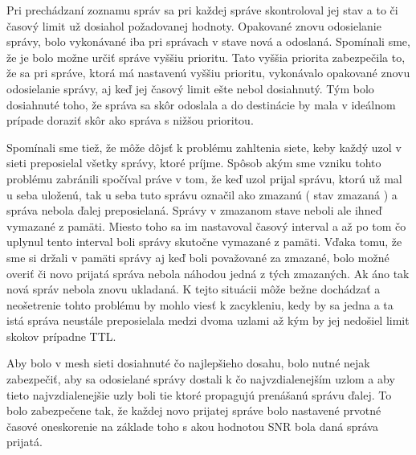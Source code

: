 \documentclass[slovak,master]{diploma}
\begin{document}
Pri prechádzaní zoznamu správ sa pri každej správe skontroloval jej stav a to či časový limit už dosiahol požadovanej hodnoty. Opakované znovu odosielanie 
správy, bolo vykonávané iba pri správach v stave nová a odoslaná. Spomínali sme, že je bolo možne určiť správe vyššiu prioritu. Tato vyššia priorita zabezpečila to, že sa pri správe, 
ktorá má nastavenú vyššiu prioritu, vykonávalo opakované znovu odosielanie správy, aj keď jej časový limit ešte nebol dosiahnutý. Tým bolo dosiahnuté toho, že správa sa 
skôr odoslala a do destinácie by mala v ideálnom prípade doraziť skôr ako správa s nižšou prioritou.

Spomínali sme tiež, že môže dôjsť k problému zahltenia siete, keby každý uzol v sieti preposielal všetky správy, ktoré príjme. Spôsob akým sme vzniku tohto problému zabránili 
spočíval práve v tom, že keď uzol prijal správu, ktorú už mal u seba uloženú, tak u seba tuto správu označil ako zmazanú ( stav zmazaná ) a správa nebola ďalej preposielaná. 
Správy v zmazanom stave neboli ale ihneď vymazané z pamäti. Miesto toho sa im nastavoval časový interval a až po tom čo uplynul tento interval boli správy skutočne vymazané z pamäti. 
Vďaka tomu, že sme si držali v pamäti správy aj keď boli považované za zmazané, bolo možné overiť či novo prijatá správa nebola náhodou jedná z tých zmazaných. Ak áno tak nová 
správ nebola znovu ukladaná. K tejto situácii môže bežne dochádzať a neošetrenie tohto problému by mohlo viesť k zacykleniu, kedy by sa jedna a ta istá správa neustále 
preposielala medzi dvoma uzlami až kým by jej nedošiel limit skokov prípadne TTL.

Aby bolo v mesh sieti dosiahnuté čo najlepšieho dosahu, bolo nutné nejak zabezpečiť, aby sa odosielané správy dostali k čo najvzdialenejším uzlom a aby tieto 
najvzdialenejšie uzly boli tie ktoré propagujú prenášanú správu ďalej. To bolo zabezpečene tak, že každej novo prijatej správe bolo nastavené prvotné časové oneskorenie na základe 
toho s akou hodnotou SNR bola daná správa prijatá. 
\end{document}
